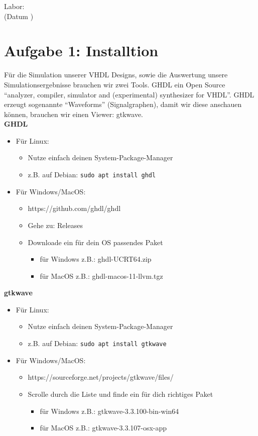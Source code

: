 \documentclass[a4paper]{scrartcl}
\def\header#1#2{
  \begin{center}
    {\Large Labor: #1 \TOPIC}\\
    {(Datum #2)}
  \end{center}
}
\begin{document}
\header{ \NUMBER}{\DATE}

\section*{Aufgabe 1: Installtion}
Für die Simulation unserer VHDL Designs, sowie die Auswertung unsere Simulationsergebnisse brauchen wir zwei Tools. GHDL
ein Open Source ``analyzer, compiler, simulator and (experimental) synthesizer for VHDL''. GHDL erzeugt sogenannte ``Waveforms''
(Signalgraphen), damit wir diese anschauen können, brauchen wir einen Viewer: gtkwave.\\

\textbf{GHDL}
\begin{itemize}
  \item Für Linux:
  \begin{itemize}
    \item Nutze einfach deinen System-Package-Manager
    \item z.B. auf Debian: \texttt{sudo apt install ghdl}
  \end{itemize}
  \item Für Windows/MacOS:
  \begin{itemize}
    \item https://github.com/ghdl/ghdl
    \item Gehe zu: Releases
    \item Downloade ein für dein OS passendes Paket
    \begin{itemize}
      \item für Windows z.B.: ghdl-UCRT64.zip
      \item für MacOS z.B.: ghdl-macos-11-llvm.tgz
    \end{itemize}
  \end{itemize}
\end{itemize}

\textbf{gtkwave}
\begin{itemize}
  \item Für Linux:
  \begin{itemize}
    \item Nutze einfach deinen System-Package-Manager
    \item z.B. auf Debian: \texttt{sudo apt install gtkwave}
  \end{itemize}
  \item Für Windows/MacOS:
  \begin{itemize}
    \item https://sourceforge.net/projects/gtkwave/files/
    \item Scrolle durch die Liste und finde ein für dich richtiges Paket
    \begin{itemize}
      \item für Windows z.B.: gtkwave-3.3.100-bin-win64
      \item für MacOS z.B.: gtkwave-3.3.107-osx-app
    \end{itemize}
  \end{itemize}
\end{itemize}
\end{document}
